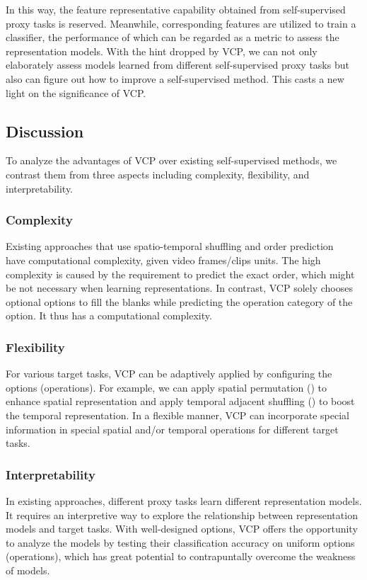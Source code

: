 \documentclass[letterpaper]{article}
\begin{document}
In this way, the feature representative capability obtained from self-supervised proxy tasks is reserved. Meanwhile, corresponding features are utilized to train a classifier, the performance of which can be regarded as a metric to assess the representation models. With the hint dropped by VCP, we can not only elaborately assess models learned from different self-supervised proxy tasks but also can figure out how to improve a self-supervised method. This casts a new light on the significance of VCP.

\subsection{Discussion}
To analyze the advantages of VCP over existing self-supervised methods, we contrast them from three aspects including complexity, flexibility, and interpretability.

\subsubsection{Complexity} 
Existing approaches that use spatio-temporal shuffling and order prediction ~\cite{kim2019self,xu2019self,lee2017unsupervised} have  computational complexity, given  video frames/clips units. 
The high complexity is caused by the requirement to predict the exact order, which might be not necessary when learning representations.
In contrast, VCP solely chooses  optional options to fill the blanks while predicting the operation category of the option. It thus has a  computational complexity. 

\subsubsection{Flexibility}
For various target tasks, VCP can be adaptively applied by configuring the options (operations). 
For example, we can apply spatial permutation () to enhance spatial representation and apply temporal adjacent shuffling () to boost the temporal representation. In a flexible manner, VCP can incorporate special information in special spatial and/or temporal operations for different target tasks.

\subsubsection{Interpretability} 
In existing approaches, different proxy tasks learn different representation models. It requires an interpretive way to explore the relationship between representation models and target tasks. 
With well-designed options, VCP offers the opportunity to analyze the models by testing their classification accuracy on uniform options (operations), which has great potential to contrapuntally overcome the weakness of models. 
\end{document}
